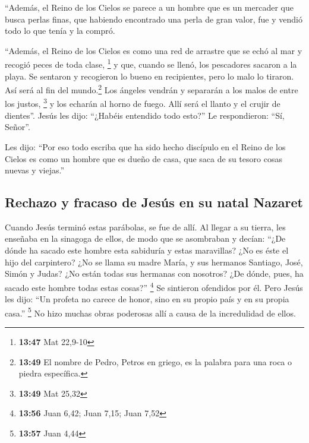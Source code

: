 \begin{paracol}{2}
 ``Además, el Reino de los Cielos se parece a un hombre
que es un mercader que busca perlas finas,  que habiendo
encontrado una perla de gran valor, fue y vendió todo lo que tenía y la
compró.

 ``Además, el Reino de los Cielos es como una red de
arrastre que se echó al mar y recogió peces de toda clase, \footnote{\textbf{13:47}
  Mat 22,9-10}  y que, cuando se llenó, los pescadores
sacaron a la playa. Se sentaron y recogieron lo bueno en recipientes,
pero lo malo lo tiraron.  Así será al fin del
mundo.\footnote{\textbf{13:49} El nombre de Pedro, Petros en griego, es
  la palabra para una roca o piedra específica.} Los ángeles vendrán y
separarán a los malos de entre los justos, \footnote{\textbf{13:49} Mat
  25,32}  y los echarán al horno de fuego. Allí será el
llanto y el crujir de dientes''.  Jesús les dijo:
``¿Habéis entendido todo esto?'' Le respondieron: ``Sí, Señor''.

 Les dijo: ``Por eso todo escriba que ha sido hecho
discípulo en el Reino de los Cielos es como un hombre que es dueño de
casa, que saca de su tesoro cosas nuevas y viejas.''

\hypertarget{rechazo-y-fracaso-de-jesuxfas-en-su-natal-nazaret}{%
\subsection{Rechazo y fracaso de Jesús en su natal
Nazaret}\label{rechazo-y-fracaso-de-jesuxfas-en-su-natal-nazaret}}

 Cuando Jesús terminó estas parábolas, se fue de allí.
 Al llegar a su tierra, les enseñaba en la sinagoga de
ellos, de modo que se asombraban y decían: ``¿De dónde ha sacado este
hombre esta sabiduría y estas maravillas?  ¿No es éste el
hijo del carpintero? ¿No se llama su madre María, y sus hermanos
Santiago, José, Simón y Judas?  ¿No están todas sus
hermanas con nosotros? ¿De dónde, pues, ha sacado este hombre todas
estas cosas?'' \footnote{\textbf{13:56} Juan 6,42; Juan 7,15; Juan 7,52}
 Se sintieron ofendidos por él. Pero Jesús les dijo: ``Un
profeta no carece de honor, sino en su propio país y en su propia
casa.'' \footnote{\textbf{13:57} Juan 4,44}  No hizo
muchas obras poderosas allí a causa de la incredulidad de ellos.

\switchcolumn
\begin{otherlanguage}{english}


\end{otherlanguage}
\end{paracol}
